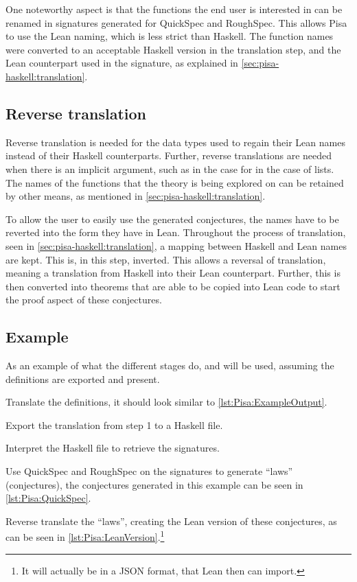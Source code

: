 One noteworthy aspect is that the functions the end user is interested in can be renamed in signatures generated for QuickSpec and RoughSpec.
This allows Pisa to use the Lean naming, which is less strict than Haskell.
The function names were converted to an acceptable Haskell version in the translation step, and the Lean counterpart used in the signature, as explained in \cref{sec:pisa-haskell:translation}.

\subsection{Reverse translation}\label{sec:pisa-haskell:reverse-translation}
Reverse translation is needed for the data types used to regain their Lean names instead of their Haskell counterparts.
Further, reverse translations are needed when there is an implicit argument, such as in the case for  in the case of lists.
The names of the functions that the theory is being explored on can be retained by other means, as mentioned in \cref{sec:pisa-haskell:translation}.

To allow the user to easily use the generated conjectures, the names have to be reverted into the form they have in Lean.
Throughout the process of translation, seen in \cref{sec:pisa-haskell:translation}, a mapping between Haskell and Lean names are kept.
This is, in this step, inverted.
This allows a reversal of translation, meaning a translation from Haskell into their Lean counterpart.
Further, this is then converted into theorems that are able to be copied into Lean code to start the proof aspect of these conjectures.

\subsection{Example}\label{sec:pisa-haskell:example}
As an example of what the different stages do,  and  will be used, assuming the definitions are exported and present.
\begin{steps}[noitemsep]
  \item Translate the definitions, it should look similar to \cref{lst:Pisa:ExampleOutput}.
  \item Export the translation from step 1 to a Haskell file.
  \item Interpret the Haskell file to retrieve the signatures.
  \item Use QuickSpec and RoughSpec on the signatures to generate ``laws'' (conjectures), the conjectures generated in this example can be seen in \cref{lst:Pisa:QuickSpec}.
  \item Reverse translate the ``laws'', creating the Lean version of these conjectures, as can be seen in \cref{lst:Pisa:LeanVersion}.\footnote{It will actually be in a JSON format, that Lean then can import.}
\end{steps}

